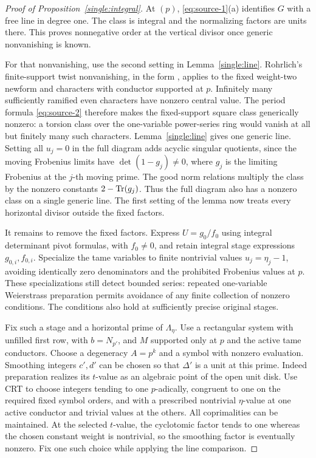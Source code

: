 \begin{proof}[Proof of Proposition~\ref{single:integral}]
At \((p)\), \eqref{eq:source-1}(a) identifies \(G\) with a free
line in degree one.  The class is integral and the normalizing
factors are units there.  This proves nonnegative order at the
vertical divisor once generic nonvanishing is known.

For that nonvanishing, use the second setting in
Lemma~\ref{single:line}.  Rohrlich's finite-support twist
nonvanishing, in the form \cite[Theorem 13.5(2)]{Kato}, applies to
the fixed weight-two newform and characters with conductor
supported at \(p\).  Infinitely many sufficiently ramified even
characters have nonzero central value.  The period formula
\eqref{eq:source-2} therefore makes the fixed-support square class
generically nonzero: a torsion class over the one-variable
power-series ring would vanish at all but finitely many such
characters.  Lemma~\ref{single:line} gives one generic line.
Setting all \(u_j=0\) in the full diagram adds acyclic singular
quotients, since the moving Frobenius limits have
\(\det(1-g_j)\ne0\), where \(g_j\) is the limiting Frobenius
at the \(j\)-th moving prime.  The good norm relations multiply the class
by the nonzero constants \(2-\operatorname{Tr}(g_j)\).  Thus the full diagram
also has a nonzero class on a single generic line.  The first
setting of the lemma now treats every horizontal divisor outside
the fixed factors.

It remains to remove the fixed factors.  Express \(U=g_0/f_0\)
using integral determinant pivot formulas, with \(f_0\ne0\), and
retain integral stage expressions \(g_{0,i},f_{0,i}\).  Specialize
the tame variables to finite nontrivial values
\(u_j=\eta_j-1\), avoiding identically zero denominators and
the prohibited Frobenius values at \(p\).  These specializations
still detect bounded series: repeated one-variable Weierstrass
preparation permits avoidance of any finite collection of
nonzero conditions.  The conditions also hold at sufficiently
precise original stages.

Fix such a stage and a horizontal prime of \(\Lambda_\eta\).
Use a rectangular system with unfilled first row, with
\(b=N_{p'}\), and \(M\) supported only at \(p\) and the active
tame conductors.  Choose a degeneracy \(A=p^k\) and a symbol
with nonzero evaluation.  Smoothing integers \(c',d'\) can be
chosen so that \(\Delta'\) is a unit at this prime.  Indeed
preparation realizes its \(t\)-value as an algebraic point of
the open unit disk.  Use CRT to choose integers tending to one
\(p\)-adically, congruent to one on the required fixed symbol
orders, and with a prescribed nontrivial \(\eta\)-value at one
active conductor and trivial values at the others.  All
coprimalities can be maintained.  At the selected \(t\)-value,
the cyclotomic factor tends to one whereas the chosen constant
weight is nontrivial, so the smoothing factor is eventually
nonzero.  Fix one such choice while applying the line comparison.


\end{proof}
